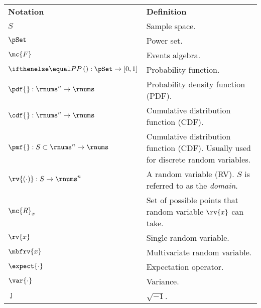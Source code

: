\begin{table}[h]
    \centering
    \begin{tabular}{p{}p{}}
        \textbf{Notation} & \textbf{Definition}\\[5pt]
        $S$ & Sample space.\\
        $\pSet$ & Power set. \\
        $\mc{F}$ & Events algebra.\\
        $\prob{}:\pSet\to[0,1]$ & Probability function.\\
        $\pdf{}:\rnums^{n}\to\rnums$ & Probability density function (PDF).\\
        $\cdf{}:\rnums^{n}\to\rnums$ & Cumulative distribution function (CDF).\\
        $\pmf{}:S\subset\rnums^{n}\to\rnums$ & Cumulative distribution function (CDF). Usually used for discrete random variables.\\
        $\rv{(\cdot)}: S\to\rnums^{n}$& A random variable (RV). $S$ is referred to as the \emph{domain}. \\
        $\mc{R}_{x}$& Set of possible points that random variable $\rv{x}$ can take. \\
        $\rv{x}$ & Single random variable.\\
        $\mbfrv{x}$ & Multivariate random variable.   \\
        $\expect{\cdot}$ & Expectation operator.\\
        $\var{\cdot}$ & Variance.      \\
        $\jmath$ & $\sqrt{-1}$.              
    \end{tabular}
\end{table}
